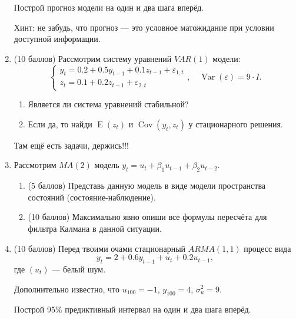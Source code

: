 \documentclass[12pt]{article}
\DeclareMathOperator{\Cov}{Cov}
\DeclareMathOperator{\Var}{Var}
\DeclareMathOperator{\E}{E}
\begin{document}
\begin{enumerate}
    Построй прогноз модели на один и два шага вперёд.
     
    Хинт: не забудь, что прогноз — это условное матожидание при условии доступной информации.
	
	\item (10 баллов) 
	Рассмотрим систему уравнений $VAR(1)$ модели:
	\[
	\begin{cases}
		y_t = 0.2 + 0.5 y_{t-1} + 0.1 z_{t-1} + \varepsilon_{1, t}\\
		z_t = 0.1 + 0.2 z_{t-1} +  \varepsilon_{2, t} 
	\end{cases}, \quad \Var(\varepsilon) = 9\cdot I.
\]
\begin{enumerate}
    \item Является ли система уравнений стабильной?
    \item Если да, то найди $\E(z_t)$ и $\Cov(y_t, z_t)$ у стационарного решения.
\end{enumerate}

Там ещё есть задачи, держись!!!

\newpage

\item Рассмотрим $MA(2)$ модель $y_t = u_t + \beta_1 u_{t-1} + \beta_2 u_{t-2}$.
\begin{enumerate}
    \item (5 баллов) Представь данную модель в виде модели пространства состояний (состояние-наблюдение). 
    \item (10 баллов) Максимально явно опиши все формулы пересчёта для фильтра Калмана в данной ситуации.
\end{enumerate}


\item (10 баллов) Перед твоими очами стационарный $ARMA(1,1)$ процесс вида
\[
y_t = 2 + 0.6 y_{t-1} + u_t + 0.2 u_{t-1},
\]
где $(u_t)$ — белый шум. 

Дополнительно известно, что $u_{100}=-1$, $y_{100}=4$, $\sigma^2_u = 9$. 

Построй 95\% предиктивный интервал на один и два шага вперёд.


\end{enumerate}
\end{document}
